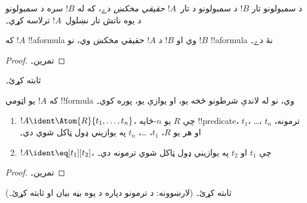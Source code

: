 \documentclass[../../../include/open-logic-section]{subfiles}
\begin{document}
\begin{defn}
د سمبولونو تار $!B$ د سمبولونو د تار~$!A$ \emph{حقيقي مخکښ} دے، که
له $!B$ سره د سمبولونو د يوه ناتش تار نښلول~$!A$ ترلاسه کړي۔
\end{defn}

\begin{lem}
که $!A$ !!a{formula} وي او $!B$ د $!A$ حقيقي مخکښ وي، نو $!B$
!!a{formula} نۀ دے۔
\end{lem}

\begin{proof}
تمرين۔
\end{proof}

\begin{prob}
 ثابته کړئ۔
\end{prob}

\begin{prop}
که $!A$ يو اټومي !!{formula} وي، نو له لاندې شرطونو څخه يو، او يوازې
يو، پوره کوي۔
\begin{enumerate}
\item $!A \ident \Atom{R}{t_1,\dots,t_n}$، چې $R$ يو $n$-ځايه
  !!{predicate}، $t_1$، \dots، $t_n$ ترمونه، او هر يو $R$،
  $t_1$، \dots، $t_n$ په يوازيني ډول ټاکل شوي دي۔
\item $!A \ident \eq[t_1][t_2]$، چې $t_1$ او $t_2$ په يوازيني ډول
  ټاکل شوي ترمونه دي۔
\end{enumerate}
\end{prop}

\begin{proof}
تمرين۔
\end{proof}

\begin{prob}
 ثابته کړئ۔ (لارښوونه: د
ترمونو دپاره د  يوه بڼه بيان او
ثابته کړئ۔)
\end{prob}
\end{document}
